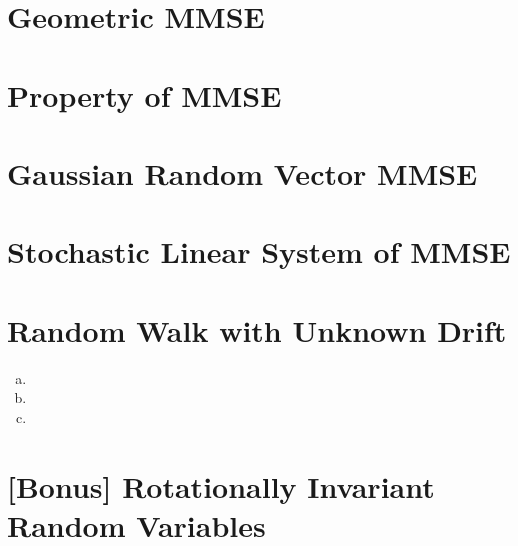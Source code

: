 \documentclass[11pt]{article}
\begin{document}
\section{Geometric MMSE}

\section{Property of MMSE}

\section{Gaussian Random Vector MMSE}

\section{Stochastic Linear System of MMSE}

\section{Random Walk with Unknown Drift}
\begin{enumerate}[(a)]
    \item

    \item

    \item
\end{enumerate}

\section{[Bonus] Rotationally Invariant Random Variables}

\clearpage
\end{document}
